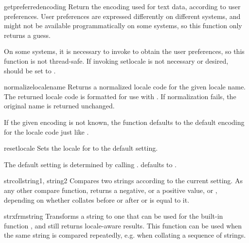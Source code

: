 \begin{funcdesc}{getpreferredencoding}{}
  Return the encoding used for text data, according to user
  preferences.  User preferences are expressed differently on
  different systems, and might not be available programmatically on
  some systems, so this function only returns a guess.

  On some systems, it is necessary to invoke 
  to obtain the user preferences, so this function is not thread-safe.
  If invoking setlocale is not necessary or desired, 
  should be set to .

\end{funcdesc}

\begin{funcdesc}{normalize}{localename}
  Returns a normalized locale code for the given locale name.  The
  returned locale code is formatted for use with
  .  If normalization fails, the original name
  is returned unchanged.

  If the given encoding is not known, the function defaults to
  the default encoding for the locale code just like
  .
\end{funcdesc}

\begin{funcdesc}{resetlocale}{}
  Sets the locale for  to the default setting.

  The default setting is determined by calling
  .   defaults to
  .
\end{funcdesc}

\begin{funcdesc}{strcoll}{string1, string2}
  Compares two strings according to the current
   setting. As any other compare function,
  returns a negative, or a positive value, or , depending on
  whether  collates before or after  or is
  equal to it.
\end{funcdesc}

\begin{funcdesc}{strxfrm}{string}
  Transforms a string to one that can be used for the built-in
  function , and still returns
  locale-aware results.  This function can be used when the same
  string is compared repeatedly, e.g. when collating a sequence of
  strings.
\end{funcdesc}

